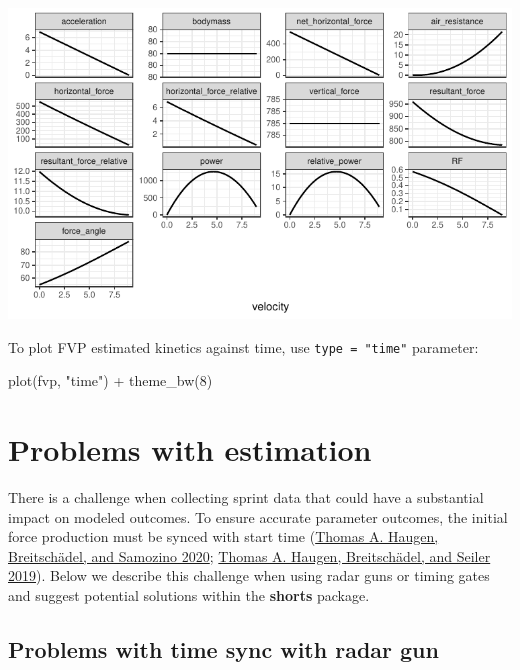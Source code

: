 \documentclass[fleqn,10pt,lineno]{wlpeerj} %
\newenvironment{Shaded}{\begin{snugshade}}{\end{snugshade}}
\newcommand{\DecValTok}[1]{\textcolor[rgb]{0.00,0.00,0.81}{#1}}
\newcommand{\FunctionTok}[1]{\textcolor[rgb]{0.00,0.00,0.00}{#1}}
\newcommand{\NormalTok}[1]{#1}
\newcommand{\SpecialCharTok}[1]{\textcolor[rgb]{0.00,0.00,0.00}{#1}}
\newcommand{\StringTok}[1]{\textcolor[rgb]{0.31,0.60,0.02}{#1}}
\begin{document}
\begin{center}\includegraphics[width=0.9\linewidth]{paper_files/figure-latex/unnamed-chunk-17-1} \end{center}

To plot FVP estimated kinetics against time, use \texttt{type\ =\ "time"} parameter:

\begin{Shaded}
\begin{Highlighting}[]
\FunctionTok{plot}\NormalTok{(fvp, }\StringTok{"time"}\NormalTok{) }\SpecialCharTok{+} \FunctionTok{theme\_bw}\NormalTok{(}\DecValTok{8}\NormalTok{)}
\end{Highlighting}
\end{Shaded}

\hypertarget{problems-with-estimation}{%
\section{Problems with estimation}\label{problems-with-estimation}}

There is a challenge when collecting sprint data that could have a substantial impact on modeled outcomes. To ensure accurate parameter outcomes, the initial force production must be synced with start time (\protect\hyperlink{ref-haugenPowerForceVelocityProfilingSprinting2020}{Thomas A. Haugen, Breitschädel, and Samozino 2020}; \protect\hyperlink{ref-haugenSprintMechanicalVariables2019}{Thomas A. Haugen, Breitschädel, and Seiler 2019}). Below we describe this challenge when using radar guns or timing gates and suggest potential solutions within the \textbf{shorts} package.

\hypertarget{problems-with-time-sync-with-radar-gun}{%
\subsection{Problems with time sync with radar gun}\label{problems-with-time-sync-with-radar-gun}}
\end{document}
